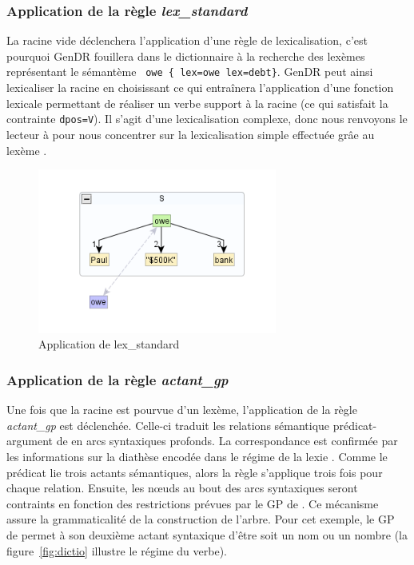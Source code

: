 \subsubsection{Application de la règle \emph{lex\_standard}}
La racine vide déclenchera l'application d'une règle de lexicalisation, c'est pourquoi GenDR fouillera dans le dictionnaire à la recherche des lexèmes représentant le sémantème  \lstinline! owe { lex=owe lex=debt}!. GenDR peut ainsi lexicaliser la racine en choisissant  ce qui entraînera l'application d'une fonction lexicale permettant de réaliser un verbe support à la racine (ce qui satisfait la contrainte \texttt{dpos=V}). Il s'agit d'une lexicalisation complexe, donc nous renvoyons le lecteur à \cite{lambrey15,LambreyImplementationcollocationspour2017,lareau18} pour nous concentrer sur la lexicalisation simple effectuée grâe au lexème .

\begin{figure}[htb]
	\centering
	\includegraphics[width=0.7\textwidth, trim = {0cm 0.7cm 0cm 0.9cm},clip]{ch3/figs/lex_standard_root.png}
		\vspace{-0.5cm}
	\caption{Application de lex\_standard}
	\label{fig:lexstand1}
\end{figure}

\subsubsection{Application de la règle \emph{actant\_gp}}
Une fois que la racine est pourvue d'un lexème, l'application de la règle \emph{actant\_gp} est déclenchée. Celle-ci traduit les relations sémantique prédicat-argument de  en arcs syntaxiques profonds. La correspondance est confirmée par les informations sur la diathèse encodée dans le régime de la lexie . Comme le prédicat lie trois actants sémantiques, alors la règle s'applique trois fois pour chaque relation. Ensuite, les n\oe{}uds au bout des arcs syntaxiques seront contraints en fonction des restrictions prévues par le \ac{GP} de . Ce mécanisme assure la grammaticalité de la construction de l'arbre. Pour cet exemple, le \ac{GP} de  permet à son deuxième actant syntaxique d'être soit un nom ou un nombre (la figure~\ref{fig:dictio} illustre le régime du verbe).

